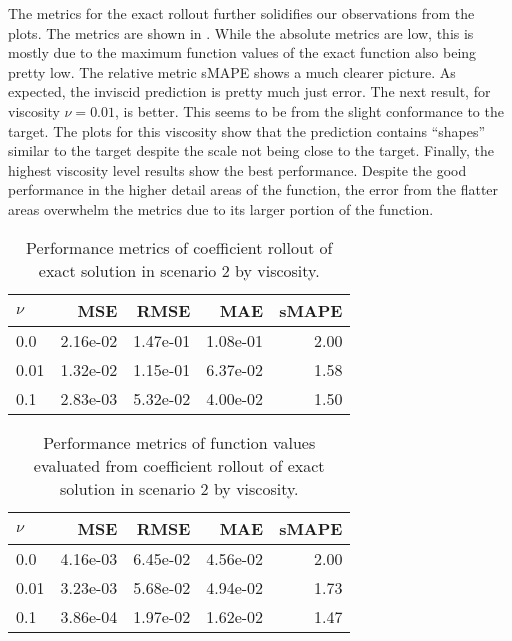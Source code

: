 The metrics for the exact rollout further solidifies our observations from the plots. The metrics are shown in . While the absolute metrics are low, this is mostly due to the maximum function values of the exact function also being pretty low. The relative metric sMAPE shows a much clearer picture. As expected, the inviscid prediction is pretty much just error. The next result, for viscosity \(\nu=0.01\), is better. This seems to be from the slight conformance to the target. The plots for this viscosity show that the prediction contains \enquote{shapes} similar to the target despite the scale not being close to the target. Finally, the highest viscosity level results show the best performance. Despite the good performance in the higher detail areas of the function, the error from the flatter areas overwhelm the metrics due to its larger portion of the function.
\begin{table}[H]
  \caption{Performance metrics of coefficient rollout of exact solution in scenario 2 by viscosity.}\label{table:scenario_2_exact_spectral_metrics}
  \centering
  \begin{tabular}{lrrrr}
    \toprule
    \(\nu \) & MSE      & RMSE     & MAE      & sMAPE \\
    \midrule
    0.0      & 2.16e-02 & 1.47e-01 & 1.08e-01 & 2.00  \\
    0.01     & 1.32e-02 & 1.15e-01 & 6.37e-02 & 1.58  \\
    0.1      & 2.83e-03 & 5.32e-02 & 4.00e-02 & 1.50  \\
    \bottomrule
  \end{tabular}
\end{table}
\begin{table}[H]
  \caption{Performance metrics of function values evaluated from coefficient rollout of exact solution in scenario 2 by viscosity.}\label{table:scenario_2_exact_function_metrics}
  \centering
  \begin{tabular}{lrrrr}
    \toprule
    \(\nu \) & MSE      & RMSE     & MAE      & sMAPE \\
    \midrule
    0.0      & 4.16e-03 & 6.45e-02 & 4.56e-02 & 2.00  \\
    0.01     & 3.23e-03 & 5.68e-02 & 4.94e-02 & 1.73  \\
    0.1      & 3.86e-04 & 1.97e-02 & 1.62e-02 & 1.47  \\
    \bottomrule
  \end{tabular}
\end{table}

